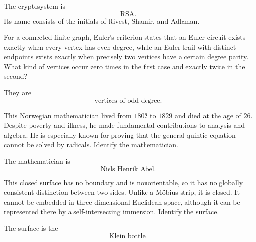     \begin{solution}
        The cryptosystem is
        \[
            \boxed{\text{RSA}}.
        \]
        Its name consists of the initials of Rivest, Shamir, and Adleman.
    \end{solution}

    \begin{expectedproblem}
        For a connected finite graph, Euler's criterion states that an Euler
        circuit exists exactly when every vertex has even degree, while an
        Euler trail with distinct endpoints exists exactly when precisely two
        vertices have a certain degree parity. What kind of vertices occur
        zero times in the first case and exactly twice in the second?
    \end{expectedproblem}

    \begin{solution}
        They are
        \[
            \boxed{\text{vertices of odd degree}}.
        \]
    \end{solution}

    \begin{expectedproblem}
        This Norwegian mathematician lived from $1802$ to $1829$ and died at
        the age of $26$. Despite poverty and illness, he made fundamental
        contributions to analysis and algebra. He is especially known for
        proving that the general quintic equation cannot be solved by radicals.
        Identify the mathematician.
    \end{expectedproblem}

    \begin{solution}
        The mathematician is
        \[
            \boxed{\text{Niels Henrik Abel}}.
        \]
    \end{solution}

    \begin{expectedproblem}
        This closed surface has no boundary and is nonorientable, so it has no
        globally consistent distinction between two sides. Unlike a
        M\"obius strip, it is closed. It cannot be embedded in
        three-dimensional Euclidean space, although it can be represented
        there by a self-intersecting immersion. Identify the surface.
    \end{expectedproblem}

    \begin{solution}
        The surface is the
        \[
            \boxed{\text{Klein bottle}}.
        \]
    \end{solution}

